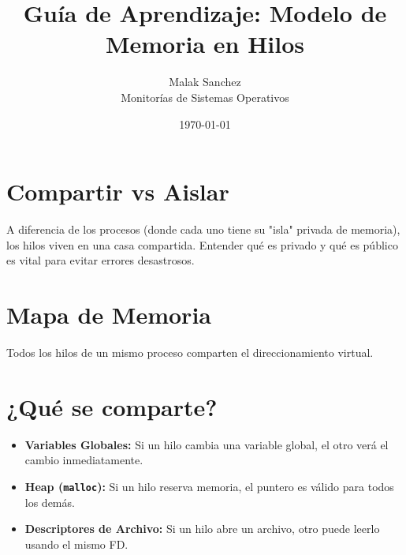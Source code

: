 \documentclass[12pt,a4paper]{article}
\title{\textbf{Guía de Aprendizaje: Modelo de Memoria en Hilos}}
\author{Malak Sanchez \\ \small Monitorías de Sistemas Operativos}
\date{\today}
\begin{document}
\maketitle

\section{Compartir vs Aislar}
A diferencia de los procesos (donde cada uno tiene su "isla" privada de memoria), los hilos viven en una casa compartida. Entender qué es privado y qué es público es vital para evitar errores desastrosos.

\section{Mapa de Memoria}
Todos los hilos de un mismo proceso comparten el direccionamiento virtual.

\begin{center}
\end{center}

\section{¿Qué se comparte?}
\begin{itemize}
    \item \textbf{Variables Globales:} Si un hilo cambia una variable global, el otro verá el cambio inmediatamente.
    \item \textbf{Heap (\texttt{malloc}):} Si un hilo reserva memoria, el puntero es válido para todos los demás.
    \item \textbf{Descriptores de Archivo:} Si un hilo abre un archivo, otro puede leerlo usando el mismo FD.
\end{itemize}
\end{document}
